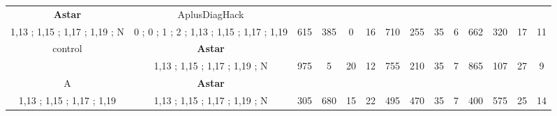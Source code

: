 \begin{table}[]
{\begin{tabular}{|c|c|c|c|c|c|c|c|c|c|c|c|c|c|}
\cellcolor{blue!15}\textbf{Astar} & AplusDiagHack& {\color[HTML]{00009B} } & {\color[HTML]{9A0000} } & {\color[HTML]{009901} } &  & {\color[HTML]{00009B} } & {\color[HTML]{9A0000} } & {\color[HTML]{009901} } &  & {\color[HTML]{00009B} } & {\color[HTML]{9A0000} } & {\color[HTML]{009901} } &  \\ 
\cellcolor{ blue!15}1,13 ; 1,15 ; 1,17 ; 1,19 ; N & 0 ; 0 ; 1 ; 2 ; 1,13 ; 1,15 ; 1,17 ; 1,19 & \multirow{-2}{*}{{\color[HTML]{00009B} 615}} & \multirow{-2}{*}{{\color[HTML]{9A0000} 385}} & \multirow{-2}{*}{{\color[HTML]{009901} 0}} & \multirow{-2}{*}{16} & \multirow{-2}{*}{{\color[HTML]{00009B} 710}} & \multirow{-2}{*}{{\color[HTML]{9A0000} 255}} & \multirow{-2}{*}{{\color[HTML]{009901} 35}} & \multirow{-2}{*}{6} & \multirow{-2}{*}{{\color[HTML]{00009B} 662}} & \multirow{-2}{*}{{\color[HTML]{9A0000} 320}} & \multirow{-2}{*}{{\color[HTML]{009901} 17}} & \multirow{-2}{*}{11} \\ \hline

control & \cellcolor{blue!15}\textbf{Astar}& {\color[HTML]{00009B} } & {\color[HTML]{9A0000} } & {\color[HTML]{009901} } &  & {\color[HTML]{00009B} } & {\color[HTML]{9A0000} } & {\color[HTML]{009901} } &  & {\color[HTML]{00009B} } & {\color[HTML]{9A0000} } & {\color[HTML]{009901} } &  \\ 
 & \cellcolor{ blue!15}1,13 ; 1,15 ; 1,17 ; 1,19 ; N & \multirow{-2}{*}{{\color[HTML]{00009B} 975}} & \multirow{-2}{*}{{\color[HTML]{9A0000} 5}} & \multirow{-2}{*}{{\color[HTML]{009901} 20}} & \multirow{-2}{*}{12} & \multirow{-2}{*}{{\color[HTML]{00009B} 755}} & \multirow{-2}{*}{{\color[HTML]{9A0000} 210}} & \multirow{-2}{*}{{\color[HTML]{009901} 35}} & \multirow{-2}{*}{7} & \multirow{-2}{*}{{\color[HTML]{00009B} 865}} & \multirow{-2}{*}{{\color[HTML]{9A0000} 107}} & \multirow{-2}{*}{{\color[HTML]{009901} 27}} & \multirow{-2}{*}{9} \\ \hline

A & \cellcolor{blue!15}\textbf{Astar}& {\color[HTML]{00009B} } & {\color[HTML]{9A0000} } & {\color[HTML]{009901} } &  & {\color[HTML]{00009B} } & {\color[HTML]{9A0000} } & {\color[HTML]{009901} } &  & {\color[HTML]{00009B} } & {\color[HTML]{9A0000} } & {\color[HTML]{009901} } &  \\ 
1,13 ; 1,15 ; 1,17 ; 1,19 & \cellcolor{ blue!15}1,13 ; 1,15 ; 1,17 ; 1,19 ; N & \multirow{-2}{*}{{\color[HTML]{00009B} 305}} & \multirow{-2}{*}{{\color[HTML]{9A0000} 680}} & \multirow{-2}{*}{{\color[HTML]{009901} 15}} & \multirow{-2}{*}{22} & \multirow{-2}{*}{{\color[HTML]{00009B} 495}} & \multirow{-2}{*}{{\color[HTML]{9A0000} 470}} & \multirow{-2}{*}{{\color[HTML]{009901} 35}} & \multirow{-2}{*}{7} & \multirow{-2}{*}{{\color[HTML]{00009B} 400}} & \multirow{-2}{*}{{\color[HTML]{9A0000} 575}} & \multirow{-2}{*}{{\color[HTML]{009901} 25}} & \multirow{-2}{*}{14} \\ \hline


\end{tabular}}
\end{table}
